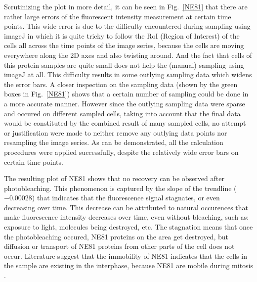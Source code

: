 Scrutinizing the plot in more detail, it can be seen in Fig.~\ref{NE81} that there are rather large errors of the fluorescent intensity measurement at certain time points. 
This wide error is due to the difficulty encountered during sampling using imageJ in which it is quite tricky to follow the RoI (Region of Interest) of the cells all across the time points of the image series, because the cells are moving everywhere along the 2D axes and also twisting around. 
And the fact that cells of this protein samples are quite small does not help the (manual) sampling using imageJ at all.
This difficulty results in some outlying sampling data which widens the error bars. 
A closer inspection on the sampling data (shown by the green boxes in Fig.~\ref{NE81}) shows that a certain number of sampling could be done in a more accurate manner. 
However since the outlying sampling data were sparse and occured on different sampled cells, taking into account that the final data would be constituted by the combined result of many sampled cells, no attempt or justification were made to neither remove any outlying data points nor resampling the image series. 
As can be demonstrated, all the calculation procedures were applied successfully, despite the relatively wide error bars on certain time points. 

The resulting plot of NE81 shows that no recovery can be observed after photobleaching. 
This phenomenon is captured by the slope of the trendline ($-0.00028$) that indicates that the fluorescence signal stagnates, or even decreasing over time.
 This decrease can be attributed to natural occurences that make fluorescence intensity decreases over time, even without bleaching, such as: exposure to light, molecules being destroyed, etc. 
 The stagnation means that once the photobleaching occured, NE81 proteins on the area get destroyed, but diffusion or transport of NE81 proteins from other parts of the cell does not occur. 
 Literature suggest that the immobility of NE81 indicates that the cells in the sample are existing in the interphase, because NE81 are mobile during mitosis \cite{Krueger2012}.

